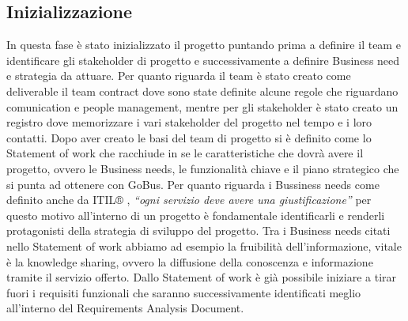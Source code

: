 \subsection{Inizializzazione}
In questa fase è stato inizializzato il progetto puntando prima a definire il team e identificare gli stakeholder di progetto e successivamente a definire Business need e strategia da attuare. Per quanto riguarda il team è stato creato come deliverable il team contract dove sono state definite alcune regole che riguardano comunication e people management, mentre per gli stakeholder è stato creato un registro dove memorizzare i vari stakeholder del progetto nel tempo e i loro contatti. Dopo aver creato le basi del team di progetto si è definito come lo Statement of work che racchiude in se le caratteristiche che dovrà avere il progetto, ovvero le Business needs, le funzionalità chiave e il piano strategico che si punta ad ottenere con GoBus. Per quanto riguarda i Bussiness needs come definito anche da ITIL® \cite{ITIL}, \emph{``ogni servizio deve avere una giustificazione''} per questo motivo all’interno di un progetto è fondamentale identificarli e renderli protagonisti della strategia di sviluppo del progetto. Tra i Business needs citati nello Statement of work abbiamo ad esempio la fruibilità dell’informazione, vitale è la knowledge sharing, ovvero la diffusione della conoscenza e informazione tramite il servizio offerto. Dallo Statement of work è già possibile iniziare a tirar fuori i requisiti funzionali che saranno successivamente identificati meglio all’interno del Requirements Analysis Document.

